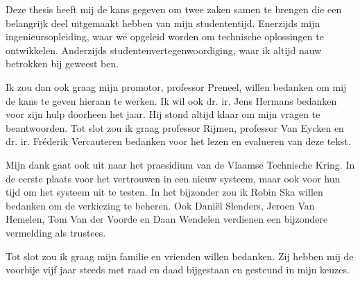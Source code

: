 %
%

Deze thesis heeft mij de kans gegeven om twee zaken samen te brengen die een belangrijk deel uitgemaakt hebben van mijn studententijd. Enerzijds mijn ingenieursopleiding, waar we opgeleid worden om technische oplossingen te ontwikkelen. Anderzijds studentenvertegenwoordiging, waar ik altijd nauw betrokken bij geweest ben.

\npar Ik zou dan ook graag mijn promotor, professor Preneel, willen bedanken om mij de kans te geven hieraan te werken. Ik wil ook dr. ir. Jens Hermans bedanken voor zijn hulp doorheen het jaar. Hij stond altijd klaar om mijn vragen te beantwoorden. Tot slot zou ik graag professor Rijmen, professor Van Eycken en dr. ir. Fréderik Vercauteren bedanken voor het lezen en evalueren van deze tekst.

\npar Mijn dank gaat ook uit naar het praesidium van de Vlaamse Technische Kring. In de eerste plaats voor het vertrouwen in een nieuw systeem, maar ook voor hun tijd om het systeem uit te testen. In het bijzonder zou ik Robin Ska willen bedanken om de verkiezing te beheren. Ook Dani\"el Slenders, Jeroen Van Hemelen, Tom Van der Voorde en Daan Wendelen verdienen een bijzondere vermelding als trustees.

\npar Tot slot zou ik graag mijn familie en vrienden willen bedanken. Zij hebben mij de voorbije vijf jaar steeds met raad en daad bijgestaan en gesteund in mijn keuzes.